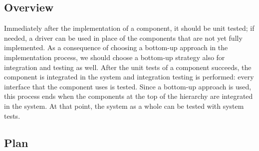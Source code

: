 \documentclass[../../main.tex]{subfiles}
\begin{document}
\subsection{Overview}

Immediately after the implementation of a component, it should be unit tested; if needed, a driver can be used in place of the components that are not yet fully implemented. 
As a consequence of choosing a bottom-up approach in the implementation process, we should choose a bottom-up strategy also for integration and testing as well. 
After the unit tests of a component succeeds, the component is integrated in the system and integration testing is performed: every interface that the component uses is tested. Since a bottom-up approach is used, this process ends when the components at the top of the hierarchy are integrated in the system.
At that point, the system as a whole can be tested with system tests.

\subsection{Plan}
\end{document}
